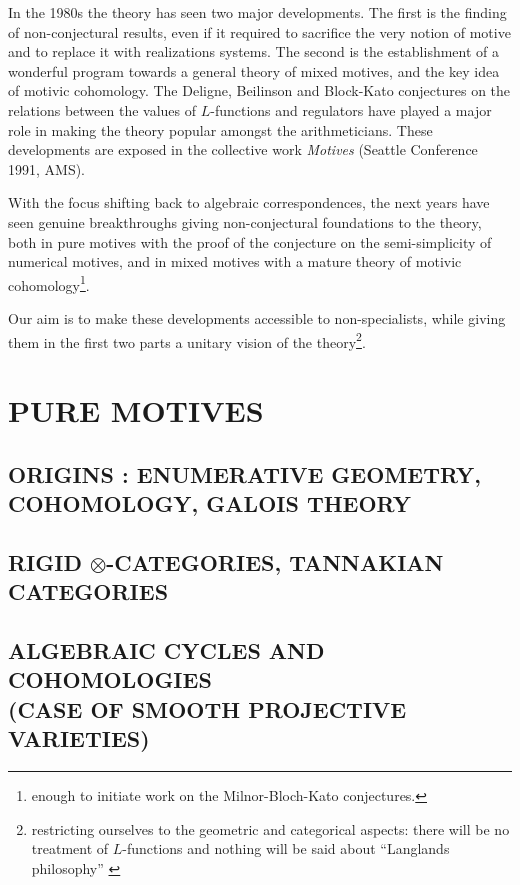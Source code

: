 \documentclass[12pt]{book}
\newcommand{\1}{\mathbf{1}}
\begin{document}
In the 1980s the theory has seen two major developments.
The first is the finding of non-conjectural results, even if it required to sacrifice the very notion of motive and to replace it with realizations systems.
The second is the establishment of a wonderful program towards a general theory of mixed motives, and the key idea of motivic cohomology.
The Deligne, Beilinson and Block-Kato conjectures on the relations between the values of $L$-functions and regulators have played a major role in making the theory popular amongst the arithmeticians.
These developments are exposed in the collective work \emph{Motives} (Seattle Conference 1991, AMS).

With the focus shifting back to algebraic correspondences, the next years have seen genuine breakthroughs giving non-conjectural foundations to the theory, both in pure motives with the proof of the conjecture on the semi-simplicity of numerical motives, and in mixed motives with a mature theory of motivic cohomology\footnote{enough to initiate work on the Milnor-Bloch-Kato conjectures.}.

Our aim is to make these developments accessible to non-specialists, while giving them in the first two parts a unitary vision of the theory\footnote{restricting ourselves to the geometric and categorical aspects: there will be no treatment of $L$-functions and nothing will be said about \enquote{Langlands philosophy} \cite{langlands79}}.

\part{PURE MOTIVES}

\chapter{ORIGINS : ENUMERATIVE GEOMETRY, COHOMOLOGY, GALOIS THEORY}



\chapter{RIGID $\otimes$-CATEGORIES, TANNAKIAN CATEGORIES}



\chapter{ALGEBRAIC CYCLES AND COHOMOLOGIES\\(CASE OF SMOOTH PROJECTIVE VARIETIES)}


\end{document}
